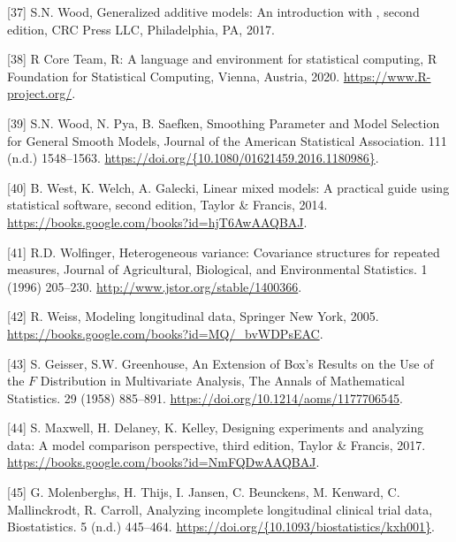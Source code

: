\documentclass[
]{article}
\begin{document}
\leavevmode\hypertarget{ref-wood2017}{}%
{[}37{]} S.N. Wood, Generalized additive models: An introduction with , second edition, CRC Press LLC, Philadelphia, PA, 2017.

\leavevmode\hypertarget{ref-r}{}%
{[}38{]} R Core Team, R: A language and environment for statistical computing, R Foundation for Statistical Computing, Vienna, Austria, 2020. \url{https://www.R-project.org/}.

\leavevmode\hypertarget{ref-wood2016}{}%
{[}39{]} S.N. Wood, N. Pya, B. Saefken, Smoothing Parameter and Model Selection for General Smooth Models, Journal of the American Statistical Association. 111 (n.d.) 1548--1563. \href{https://doi.org/\%7B10.1080/01621459.2016.1180986\%7D}{https://doi.org/\{10.1080/01621459.2016.1180986\}}.

\leavevmode\hypertarget{ref-west2014}{}%
{[}40{]} B. West, K. Welch, A. Galecki, Linear mixed models: A practical guide using statistical software, second edition, Taylor \& Francis, 2014. \url{https://books.google.com/books?id=hjT6AwAAQBAJ}.

\leavevmode\hypertarget{ref-wolfinger1996}{}%
{[}41{]} R.D. Wolfinger, Heterogeneous variance: Covariance structures for repeated measures, Journal of Agricultural, Biological, and Environmental Statistics. 1 (1996) 205--230. \url{http://www.jstor.org/stable/1400366}.

\leavevmode\hypertarget{ref-weiss2005}{}%
{[}42{]} R. Weiss, Modeling longitudinal data, Springer New York, 2005. \url{https://books.google.com/books?id=MQ/_bvWDPsEAC}.

\leavevmode\hypertarget{ref-geisser1958}{}%
{[}43{]} S. Geisser, S.W. Greenhouse, An Extension of Box's Results on the Use of the \(F\) Distribution in Multivariate Analysis, The Annals of Mathematical Statistics. 29 (1958) 885--891. \url{https://doi.org/10.1214/aoms/1177706545}.

\leavevmode\hypertarget{ref-maxwell2017}{}%
{[}44{]} S. Maxwell, H. Delaney, K. Kelley, Designing experiments and analyzing data: A model comparison perspective, third edition, Taylor \& Francis, 2017. \url{https://books.google.com/books?id=NmFQDwAAQBAJ}.

\leavevmode\hypertarget{ref-molenberghs2004}{}%
{[}45{]} G. Molenberghs, H. Thijs, I. Jansen, C. Beunckens, M. Kenward, C. Mallinckrodt, R. Carroll, Analyzing incomplete longitudinal clinical trial data, Biostatistics. 5 (n.d.) 445--464. \href{https://doi.org/\%7B10.1093/biostatistics/kxh001\%7D}{https://doi.org/\{10.1093/biostatistics/kxh001\}}.
\end{document}
